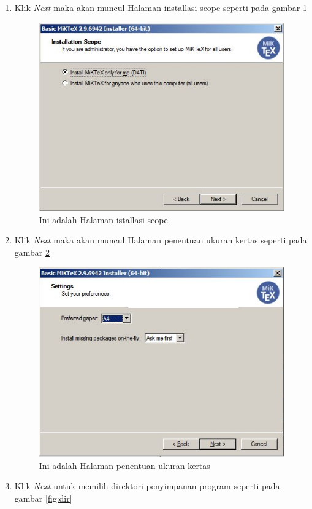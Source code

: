 \begin{enumerate}
\begin{figure}[!htbp]
		 \end{figure}
	\item Klik \textit{Next} maka akan muncul Halaman installasi scope seperti pada gambar \ref{fig:IS}
		 \begin{figure}[!htbp]
  		 \centering
 		 \includegraphics[width=.75\textwidth]{figures/Miktex/IS.JPG}
  		 \caption{Ini adalah Halaman istallasi scope}\label{fig:IS}
		 \end{figure}
	\item Klik \textit{Next} maka akan muncul Halaman penentuan ukuran kertas seperti pada gambar \ref{fig:paper}
		 \begin{figure}[!htbp]
  		 \centering
 		 \includegraphics[width=.75\textwidth]{figures/Miktex/paper.JPG}
  		 \caption{Ini adalah Halaman penentuan ukuran kertas}\label{fig:paper}
		 \end{figure}
	\item Klik \textit{Next} untuk memilih direktori penyimpanan program seperti pada gambar \ref{fig:dir}
		 \begin{figure}[!htbp]
  		 \centering

\end{figure}
\end{enumerate}
